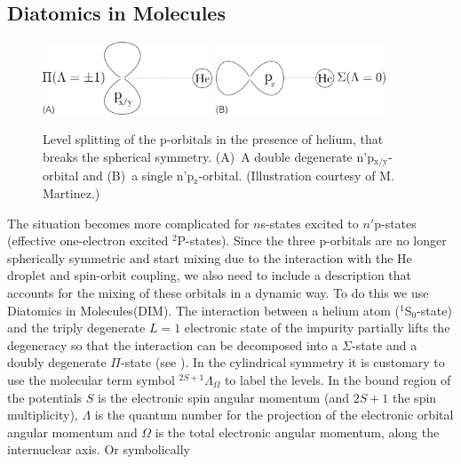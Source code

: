 		\subsection{Diatomics in Molecules}\label{sec:dim-model}
			\begin{figure}[t]
				\begin{center}
					\includegraphics[width=0.45\textwidth]{pxy-he}
					\hspace{20pt}
					\includegraphics[width=0.45\textwidth]{pz-he}
				\end{center}
				\caption{Level splitting of the p-orbitals in the presence of helium, that breaks the spherical symmetry. (A)~A double degenerate n'p$_\mathrm{x/y}$-orbital and (B)~a single n'p$_\mathrm{z}$-orbital. (Illustration courtesy of M. Martinez\citep{Martinez2017}.)}
				\label{fig:p-orbitals}
			\end{figure}				
			The situation becomes more complicated for $n$s-states excited to $n'$p-states (effective one-electron excited $^2$P-states). Since the three p-orbitals are no longer spherically symmetric and start mixing due to the interaction with the He droplet and spin-orbit coupling, we also need to include a description that accounts for the mixing of these orbitals in a dynamic way. To do this we use Diatomics in Molecules\citep{Ellison1963}(DIM). The interaction between a helium atom ($^1$S$_0$-state) and the triply degenerate $L=1$ electronic state of the impurity partially lifts the degeneracy so that the interaction can be decomposed into a $\Sigma$-state and a doubly degenerate $\Pi$-state (see ). In the cylindrical symmetry it is customary to use the molecular term symbol $^{2S+1}\Lambda_\Omega$ to label the levels. In the bound region of the potentials $S$ is the electronic spin angular momentum (and $2S+1$ the spin multiplicity), $\Lambda$ is the quantum number for the projection of the electronic orbital angular momentum and $\Omega$ is the total electronic angular momentum, along the internuclear axis. Or symbolically

